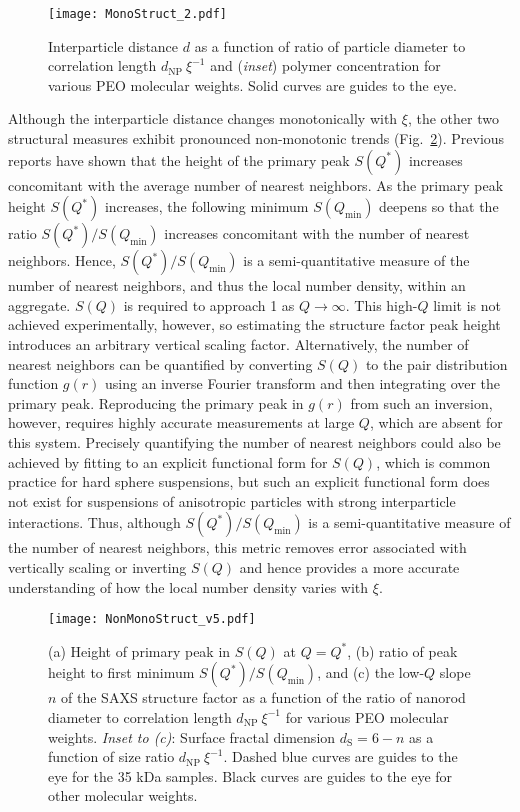 \documentclass[journal=jacsat, superscriptaddress]{achemso}
\def\EDITS#1{{\color{black}#1}}
\def\EDITS#1{#1}
\def\EDITSJCC#1{{\color{black}#1}}
\def\EDITSJCC#1{#1}
\begin{document}
\begin{figure}[ht!]
\texttt{[image: MonoStruct\_2.pdf]}
\caption{\label{fig:dspacing} Interparticle distance $d$ as a function of ratio of particle diameter to correlation length $d_\mathrm{NP}\:\xi^{-1}$ and (\textit{inset}) polymer concentration for various PEO molecular weights. Solid curves are guides to the eye.}
\end{figure}

Although the interparticle distance changes monotonically with $\xi$, the other two structural measures exhibit pronounced non-monotonic trends (Fig.\ \ref{fig:SlopeNN}). Previous reports have shown that the height of the primary peak $S(Q^*)$ increases concomitant with the average number of nearest neighbors.\cite{Ramsay1983,Svensson1980} \EDITS{As the primary peak height $S(Q^*)$ increases, the following minimum $S(Q_\mathrm{min})$ deepens so that the ratio $S(Q^*)/S(Q_\mathrm{min})$ increases \EDITSJCC{concomitant} with \EDITSJCC{the} number of nearest neighbors. Hence,} $S(Q^*)/S(Q_\mathrm{min})$ is a semi-quantitative measure of the number of nearest neighbors, and thus the local number density, within an aggregate.  $S(Q)$ is required to approach 1 as $Q \to \infty$. This high-$Q$ limit is not achieved experimentally, however, so estimating the structure factor peak height introduces an arbitrary vertical scaling factor. Alternatively, the number of nearest neighbors can be quantified by converting $S(Q)$ to the pair distribution function $g(r)$ using an inverse Fourier transform and then integrating over the primary peak.\cite{Salmon1988,Cristiglio2009} Reproducing the primary peak in $g(r)$ from such an inversion, however, requires highly accurate measurements at large $Q$, which are absent for this system. \EDITS{Precisely quantifying the number of nearest neighbors could also be achieved by fitting to an explicit functional form for $S(Q)$, which is common practice for hard sphere suspensions, but such an explicit functional form does not exist for suspensions of anisotropic particles with strong interparticle interactions.} Thus, although $S(Q^*)/S(Q_\mathrm{min})$ is a semi-quantitative measure of the number of nearest neighbors, this metric removes error associated with vertically scaling or inverting $S(Q)$ and hence provides a more accurate understanding of how the local number density varies with $\xi$. 

\begin{figure}[ht!]
\texttt{[image: NonMonoStruct\_v5.pdf]}
\caption{\label{fig:SlopeNN} (a) Height of primary peak in $S(Q)$ at $Q = Q^*$, (b) ratio of peak height to first minimum $S(Q^*)/S(Q_\mathrm{min})$, and (c) the low-$Q$ slope $n$ of the SAXS structure factor as a function of the ratio of nanorod diameter to correlation length $d_\mathrm{NP}\: \xi^{-1}$ for various PEO molecular weights. \textit{Inset to (c)}: Surface fractal dimension $d_\mathrm{S} = 6 - n$ as a function of size ratio $d_\mathrm{NP}\: \xi^{-1}$. Dashed blue curves are guides to the eye for the 35 kDa samples. Black curves are guides to the eye for other molecular weights.}
\end{figure}
\end{document}
